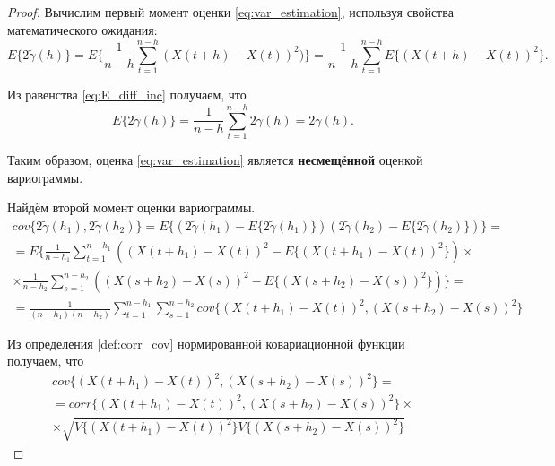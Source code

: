 \begin{proof}

Вычислим первый момент оценки \eqref{eq:var_estimation}, используя свойства математического ожидания:
\begin{equation*}
	E \{ 2 \tilde{\gamma}(h) \} = E \{ \frac{1}{n - h} \sum_{t = 1}^{n - h}(X(t + h) - X(t))^2) \} = \frac{1}{n - h} \sum_{t = 1}^{n - h} E \{ (X(t + h) - X(t))^2 \}.
\end{equation*}

Из равенства \eqref{eq:E_diff_inc} получаем, что
\begin{equation*}
	E \{ 2 \tilde{\gamma}(h) \} = \frac{1}{n - h} \sum_{t = 1}^{n - h} 2 \gamma(h) = 2 \gamma(h).
\end{equation*}

Таким образом, оценка \eqref{eq:var_estimation} является \textbf{несмещённой} оценкой вариограммы.

Найдём второй момент оценки вариограммы.
\begin{equation}\begin{gathered}
\label{eq:cov_support}
	cov\{ 2 \tilde{\gamma}(h_1), 2 \tilde{\gamma}(h_2) \} = E\{ (2 \tilde{\gamma}(h_1) - E\{ 2 \tilde{\gamma}(h_1) \}) (2 \tilde{\gamma}(h_2) - E\{ 2 \tilde{\gamma}(h_2) \}) \} = \\
	= E\{ \frac{1}{n - h_1} \sum_{t = 1}^{n - h_1}((X(t + h_1) - X(t))^2 - E\{ (X(t + h_1) - X(t))^2 \}) \times \\
	\times \frac{1}{n - h_2} \sum_{s = 1}^{n - h_2}((X(s + h_2) - X(s))^2 - E\{ (X(s + h_2) - X(s))^2 \}) \} = \\
	= \frac{1}{(n - h_1)(n - h_2)} \sum_{t = 1}^{n - h_1}\sum_{s = 1}^{n - h_2} cov\{ (X(t + h_1) - X(t))^2, (X(s + h_2) - X(s))^2 \}
\end{gathered}\end{equation}

Из определения \ref{def:corr_cov} нормированной ковариационной функции получаем, что
\begin{equation*}\begin{gathered}
	cov\{ (X(t + h_1) - X(t))^2, (X(s + h_2) - X(s))^2 \} =  \\
	= corr\{(X(t + h_1) - X(t))^2, (X(s + h_2) - X(s))^2 \} \times \\
	\times \sqrt{V\{ (X( t + h_1) - X(t))^2 \} V\{ (X(s + h_2) - X(s))^2 \}}
\end{gathered}\end{equation*}


\end{proof}
